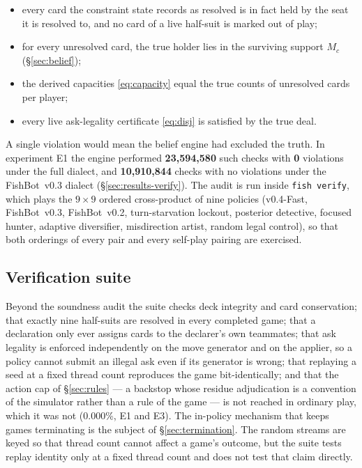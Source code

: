 \documentclass[11pt]{article}
\theoremstyle{definition}
\DeclareRobustCommand{\vfast}{\texorpdfstring{\mbox{v0.4-Fast}}{v0.4-Fast}}
\DeclareRobustCommand{\vthree}{\texorpdfstring{\mbox{FishBot v0.3}}{FishBot v0.3}}
\DeclareRobustCommand{\vtwo}{\texorpdfstring{\mbox{FishBot v0.2}}{FishBot v0.2}}
\newcommand{\numAuditChecks}{23{,}594{,}580}
\newcommand{\numAuditViolations}{0}
\newcommand{\numAuditChecksLegacy}{10{,}910{,}844}
\newcommand{\numLimitRate}{0.000\%}
\begin{document}
\begin{itemize}
  \item every card the constraint state records as resolved is in fact held by
        the seat it is resolved to, and no card of a live half-suit is marked out
        of play;
  \item for every unresolved card, the true holder lies in the surviving support
        $M_c$ (\S\ref{sec:belief});
  \item the derived capacities \eqref{eq:capacity} equal the true counts of
        unresolved cards per player;
  \item every live ask-legality certificate \eqref{eq:disj} is satisfied by the
        true deal.
\end{itemize}

A single violation would mean the belief engine had excluded the truth. In
experiment E1 the engine performed \textbf{\numAuditChecks} such checks with
\textbf{\numAuditViolations} violations under the full dialect, and
\textbf{\numAuditChecksLegacy} checks with no violations under the \vthree{}
dialect (\S\ref{sec:results-verify}). The audit is run inside \texttt{fish
verify}, which plays the $9 \times 9$ ordered cross-product of nine policies
(\vfast{}, \vthree{}, \vtwo{}, turn-starvation lockout, posterior detective,
focused hunter, adaptive diversifier, misdirection artist, random legal control),
so that both orderings of every pair and every self-play pairing are exercised.

\subsection{Verification suite}

Beyond the soundness audit the suite checks deck integrity and card
conservation; that exactly nine half-suits are resolved in every completed game;
that a declaration only ever assigns cards to the declarer's own teammates; that
ask legality is enforced independently on the move generator and on the applier,
so a policy cannot submit an illegal ask even if its generator is wrong; that
replaying a seed at a fixed thread count reproduces the game bit-identically;
and that the action cap of \S\ref{sec:rules} --- a backstop whose residue
adjudication is a convention of the simulator rather than a rule of the game ---
is not reached in ordinary play, which it was not (\numLimitRate{}, E1 and E3).
The in-policy mechanism that keeps games terminating is the subject of
\S\ref{sec:termination}. The random streams are keyed so that thread count
cannot affect a game's outcome, but the suite tests replay identity only at a
fixed thread count and does not test that claim directly.
\end{document}
